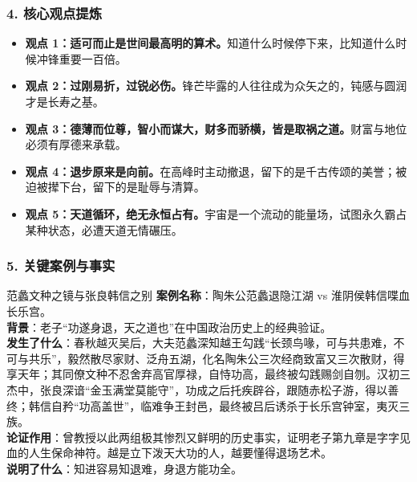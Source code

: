 \subsubsection{4. 核心观点提炼}
\begin{itemize}
    \item \textbf{观点 1：适可而止是世间最高明的算术。}知道什么时候停下来，比知道什么时候冲锋重要一百倍。
    \item \textbf{观点 2：过刚易折，过锐必伤。}锋芒毕露的人往往成为众矢之的，钝感与圆润才是长寿之基。
    \item \textbf{观点 3：德薄而位尊，智小而谋大，财多而骄横，皆是取祸之道。}财富与地位必须有厚德来承载。
    \item \textbf{观点 4：退步原来是向前。}在高峰时主动撤退，留下的是千古传颂的美誉；被迫被撵下台，留下的是耻辱与清算。
    \item \textbf{观点 5：天道循环，绝无永恒占有。}宇宙是一个流动的能量场，试图永久霸占某种状态，必遭天道无情碾压。
\end{itemize}

\subsubsection{5. 关键案例与事实}
\begin{CaseBox}{范蠡文种之镜与张良韩信之别}
\textbf{案例名称}：陶朱公范蠡退隐江湖 vs 淮阴侯韩信喋血长乐宫。\\
\textbf{背景}：老子“功遂身退，天之道也”在中国政治历史上的经典验证。\\
\textbf{发生了什么}：春秋越灭吴后，大夫范蠡深知越王勾践“长颈鸟喙，可与共患难，不可与共乐”，毅然散尽家财、泛舟五湖，化名陶朱公三次经商致富又三次散财，得享天年；其同僚文种不忍舍弃高官厚禄，自恃功高，最终被勾践赐剑自刎。汉初三杰中，张良深谙“金玉满堂莫能守”，功成之后托疾辟谷，跟随赤松子游，得以善终；韩信自矜“功高盖世”，临难争王封邑，最终被吕后诱杀于长乐宫钟室，夷灭三族。\\
\textbf{论证作用}：曾教授以此两组极其惨烈又鲜明的历史事实，证明老子第九章是字字见血的人生保命神符。越是立下泼天大功的人，越要懂得退场艺术。\\
\textbf{说明了什么}：知进容易知退难，身退方能功全。
\end{CaseBox}

